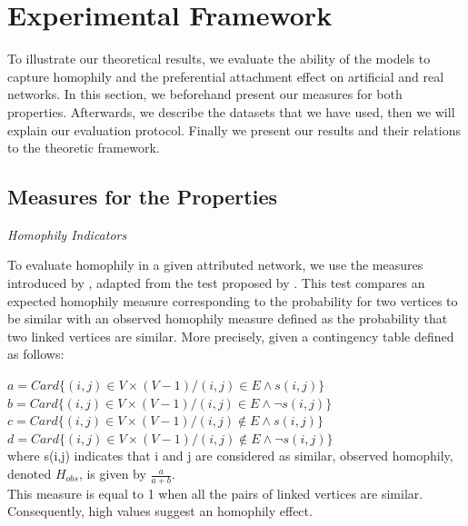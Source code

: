 \section{Experimental Framework}

To illustrate our theoretical results, we evaluate the ability of the models to capture homophily and the preferential attachment effect on artificial and real networks. In this section, we beforehand present our measures for both properties. Afterwards, we describe the datasets that we have used, then we will explain our evaluation protocol. Finally we present our results and their relations to the theoretic framework.









\subsection{Measures for the Properties}

\textit{Homophily Indicators}

To evaluate homophily in a given attributed network, we use the measures introduced by \cite{largeron2015}, adapted from the test proposed by \cite{Easley2010}.  This test compares an expected homophily measure corresponding to the probability for two vertices to be similar with an observed homophily measure defined as the probability that two linked vertices are similar. More precisely, given a contingency table defined as follows:

$a = Card\{(i,j)\in V\times (V-1) / (i,j) \in E \land s(i,j)\}$\\
$b = Card\{(i,j)\in V\times (V-1) / (i,j) \in E \land \neg{s(i,j)}\}$\\ 
$c = Card\{(i,j)\in V\times (V-1) / (i,j) \notin E \land s(i,j)\}$\\
$d = Card\{(i,j)\in V\times (V-1) / (i,j) \notin E \land \neg{s(i,j)}\}$\\

where  s(i,j) indicates that i and j are considered as similar, observed homophily, denoted $H_{obs}$, is given by $\frac{a}{a+b}$.\\
This measure  is equal to 1 when all the pairs of linked vertices are similar. Consequently, high values suggest an homophily effect.

